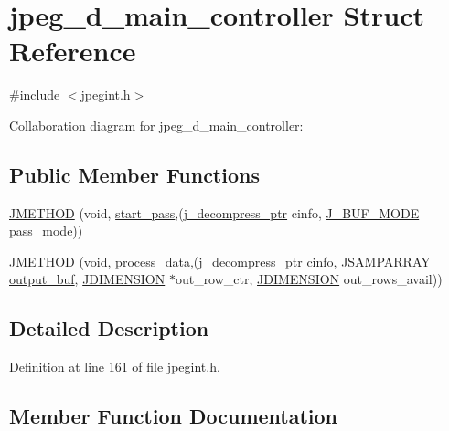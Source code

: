 \hypertarget{structjpeg__d__main__controller}{}\section{jpeg\+\_\+d\+\_\+main\+\_\+controller Struct Reference}
\label{structjpeg__d__main__controller}


{\ttfamily \#include $<$jpegint.\+h$>$}



Collaboration diagram for jpeg\+\_\+d\+\_\+main\+\_\+controller\+:
\subsection*{Public Member Functions}
\begin{DoxyCompactItemize}
\item 
\mbox{\hyperlink{structjpeg__d__main__controller_a6fd68ad0d0296dcc299119db1128c294}{J\+M\+E\+T\+H\+OD}} (void, \mbox{\hyperlink{jddctmgr_8c_a1964f006adb8fb80f57e455f6452aec1}{start\+\_\+pass}},(\mbox{\hyperlink{jpeglib_8h_a00c7d78af44bd26a901c791ccfc1e178}{j\+\_\+decompress\+\_\+ptr}} cinfo, \mbox{\hyperlink{jpegint_8h_a1f0803342372ac62b6903c399399c874}{J\+\_\+\+B\+U\+F\+\_\+\+M\+O\+DE}} pass\+\_\+mode))
\item 
\mbox{\hyperlink{structjpeg__d__main__controller_affd488d3ef78b5080ec5b2a00c8198a5}{J\+M\+E\+T\+H\+OD}} (void, process\+\_\+data,(\mbox{\hyperlink{jpeglib_8h_a00c7d78af44bd26a901c791ccfc1e178}{j\+\_\+decompress\+\_\+ptr}} cinfo, \mbox{\hyperlink{jpeglib_8h_ac9d5d1b829ed51769db69a37271a7e91}{J\+S\+A\+M\+P\+A\+R\+R\+AY}} \mbox{\hyperlink{jdct_8h_ad7e4660a191b1a791748dd44d5a7a0ec}{output\+\_\+buf}}, \mbox{\hyperlink{jmorecfg_8h_a04ed4674f6f1d0d50ec241531e38274f}{J\+D\+I\+M\+E\+N\+S\+I\+ON}} $\ast$out\+\_\+row\+\_\+ctr, \mbox{\hyperlink{jmorecfg_8h_a04ed4674f6f1d0d50ec241531e38274f}{J\+D\+I\+M\+E\+N\+S\+I\+ON}} out\+\_\+rows\+\_\+avail))
\end{DoxyCompactItemize}


\subsection{Detailed Description}


Definition at line 161 of file jpegint.\+h.



\subsection{Member Function Documentation}
\mbox{\label{structjpeg__d__main__controller_a6fd68ad0d0296dcc299119db1128c294}} 
